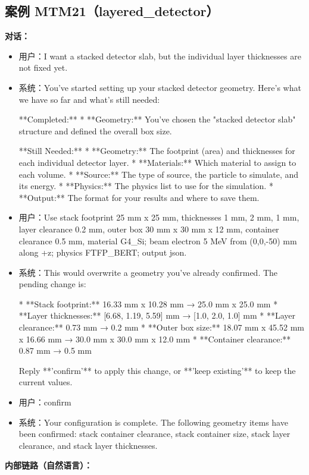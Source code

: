 \documentclass[11pt]{ctexart}
\begin{document}
\subsection{案例 MTM21（layered\_detector）}
\textbf{对话：}
\begin{itemize}
\item 用户：I want a stacked detector slab, but the individual layer thicknesses are not fixed yet.
\item 系统：You've started setting up your stacked detector geometry. Here's what we have so far and what's still needed:

**Completed:**
*   **Geometry:** You've chosen the "stacked detector slab" structure and defined the overall box size.

**Still Needed:**
*   **Geometry:** The footprint (area) and thicknesses for each individual detector layer.
*   **Materials:** Which material to assign to each volume.
*   **Source:** The type of source, the particle to simulate, and its energy.
*   **Physics:** The physics list to use for the simulation.
*   **Output:** The format for your results and where to save them.
\item 用户：Use stack footprint 25 mm x 25 mm, thicknesses 1 mm, 2 mm, 1 mm, layer clearance 0.2 mm, outer box 30 mm x 30 mm x 12 mm, container clearance 0.5 mm, material G4\_Si; beam electron 5 MeV from (0,0,-50) mm along +z; physics FTFP\_BERT; output json.
\item 系统：This would overwrite a geometry you've already confirmed. The pending change is:

*   **Stack footprint:** 16.33 mm x 10.28 mm → 25.0 mm x 25.0 mm
*   **Layer thicknesses:** [6.68, 1.19, 5.59] mm → [1.0, 2.0, 1.0] mm
*   **Layer clearance:** 0.73 mm → 0.2 mm
*   **Outer box size:** 18.07 mm x 45.52 mm x 16.66 mm → 30.0 mm x 30.0 mm x 12.0 mm
*   **Container clearance:** 0.87 mm → 0.5 mm

Reply **'confirm'** to apply this change, or **'keep existing'** to keep the current values.
\item 用户：confirm
\item 系统：Your configuration is complete. The following geometry items have been confirmed: stack container clearance, stack container size, stack layer clearance, and stack layer thicknesses.
\end{itemize}
\textbf{内部链路（自然语言）：}
\end{document}
